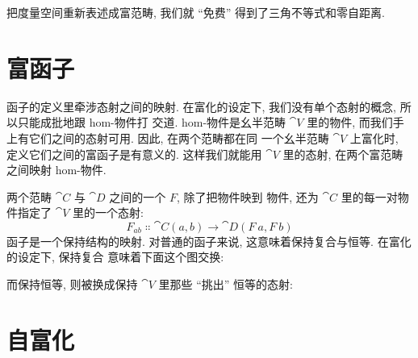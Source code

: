 把度量空间重新表述成富范畴, 我们就 ``免费'' 得到了三角不等式和零自距离.

\section{富函子}

函子的定义里牵涉态射之间的映射. 在富化的设定下, 我们没有单个态射的概念, 所以只能成批地跟 hom-物件打
交道. hom-物件是幺半范畴 $\cat{V}$ 里的物件, 而我们手上有它们之间的态射可用. 因此, 在两个范畴都在同
一个幺半范畴 $\cat{V}$ 上富化时, 定义它们之间的富函子是有意义的. 这样我们就能用 $\cat{V}$ 里的态射,
在两个富范畴之间映射 hom-物件.

两个范畴 $\cat{C}$ 与 $\cat{D}$ 之间的一个  $F$, 除了把物件映到
物件, 还为 $\cat{C}$ 里的每一对物件指定了 $\cat{V}$ 里的一个态射:
\[F_{a b} \Colon \cat{C}(a, b) \to \cat{D}(F\ a, F\ b)\]
函子是一个保持结构的映射. 对普通的函子来说, 这意味着保持复合与恒等. 在富化的设定下, 保持复合
意味着下面这个图交换:

\begin{figure}[H]
  \centering
\end{figure}

\noindent
而保持恒等, 则被换成保持 $\cat{V}$ 里那些 ``挑出'' 恒等的态射:

\begin{figure}[H]
  \centering
\end{figure}

\section{自富化}

